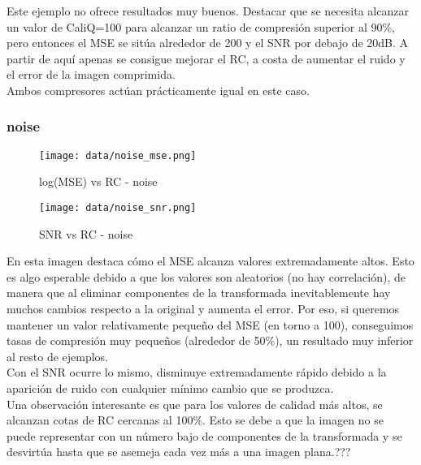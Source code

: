 \documentclass[12pt,a4paper]{article}
\begin{document}
Este ejemplo no ofrece resultados muy buenos. Destacar que se necesita alcanzar un valor de CaliQ=100 para alcanzar un ratio de compresión superior al 90\%, pero entonces el MSE se sitúa alrededor de 200 y el SNR por debajo de 20dB. A partir de aquí apenas se consigue mejorar el RC, a costa de aumentar el ruido y el error de la imagen comprimida.\\

Ambos compresores actúan prácticamente igual en este caso.

\subsubsection{noise}
\hspace*{-2.5em}
\begin{minipage}{0.5\textwidth}
        \centering
        \begin{figure}[H]
    \centering
    \texttt{[image: data/noise\_mse.png]}
    \caption{log(MSE) vs RC - noise}
    
\end{figure}
\end{minipage}\hfill
    \begin{minipage}{0.5\textwidth}
        \centering
        \begin{figure}[H]
    \centering
    \texttt{[image: data/noise\_snr.png]}
    \caption{SNR vs RC - noise}
    
\end{figure}
\end{minipage}
\vspace{2em}


En esta imagen destaca cómo el MSE alcanza valores extremadamente altos. Esto es algo esperable debido a que los valores son aleatorios (no hay correlación), de manera que al eliminar componentes de la transformada inevitablemente hay muchos cambios respecto a la original y aumenta el error. Por eso, si queremos mantener un valor relativamente pequeño del MSE (en torno a 100), conseguimos tasas de compresión muy pequeños (alrededor de 50\%), un resultado muy inferior al resto de ejemplos.\\

Con el SNR ocurre lo mismo, disminuye extremadamente rápido debido a la aparición de ruido con cualquier mínimo cambio que se produzca.\\

Una observación interesante es que para los valores de calidad más altos, se alcanzan cotas de RC cercanas al 100\%. Esto se debe a que la imagen no se puede representar con un número bajo de componentes de la transformada y se desvirtúa hasta que se asemeja cada vez más a una imagen plana.???\\
\end{document}
